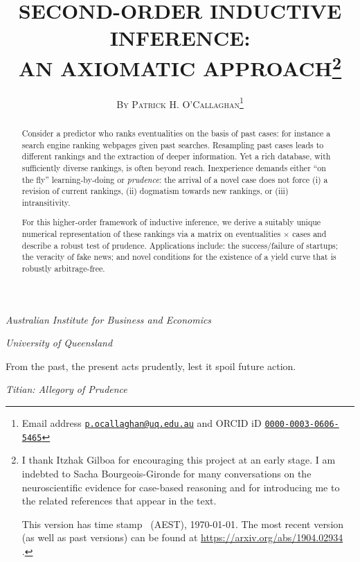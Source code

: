 \documentclass[12pt,a4paper,twoside]{article}
\title{\MakeUppercase{Second-order Inductive Inference:\\ an axiomatic
    approach}\footnote{I thank Itzhak Gilboa for encouraging this project at an
    early stage. I am indebted to Sacha Bourgeois-Gironde for many conversations
    on the neuroscientific evidence for case-based reasoning and for introducing
    me to the related references that appear in the text.

    This version has time stamp \currenttime~(AEST), \today. The most recent
    version (as well as past versions) can be found at
    \url{https://arxiv.org/abs/1904.02934} .}}
\author{\large\textsc{By Patrick H. O'Callaghan}\footnote{Email address
    \href{mailto:p.ocallaghan@uq.edu.au}{\texttt{p.ocallaghan@uq.edu.au}} and
    ORCID iD \href{http://orcid.org/0000-0003-0606-5465}{
      \texttt{0000-0003-0606-5465}} }}
\date{}
\makeatletter
\renewcommand\maketitle
  {\begin{center}\mdseries\large
    {\@title}%
    \par\medskip\medskip
    {\normalsize\@author}%
    \par\medskip\medskip\normalfont
    \begin{small}
\emph{Australian Institute for Business and Economics}
\end{small}
\par
\begin{small}
\emph{University of Queensland}
\end{small}
   \end{center}
  }
\makeatother
\begin{document}
  \maketitle

  \pagestyle{fancy}
\renewcommand{\abstractname}{\vspace{-\baselineskip}} \thispagestyle{plain}
%

\begin{abstract}%
  Consider a predictor who ranks eventualities on the basis of past cases: for
  instance a search engine ranking webpages given past searches. Resampling past
  cases leads to different rankings and the extraction of deeper
  information. Yet a rich database, with sufficiently diverse rankings, is often
  beyond reach. Inexperience demands either ``on the fly'' learning-by-doing or
  \emph{prudence}: the arrival of a novel case does not force (i) a revision of
  current rankings, (ii) dogmatism towards new rankings, or (iii)
  intransitivity.

  For this higher-order framework of inductive inference, we derive a suitably
  unique numerical representation of these rankings via a matrix on
  eventualities $\times$ cases and describe a robust test of
  prudence. Applications include: the success/failure of startups; the veracity
  of fake news; and novel conditions for the existence of a yield curve that is
  robustly arbitrage-free.
\end{abstract}
\setlength{\epigraphwidth}{11.5cm}
\epigraph{From the past, the present acts prudently, lest it spoil future
  action.}{\emph{Titian:  Allegory of Prudence}
}
\end{document}

